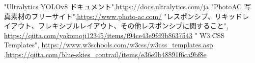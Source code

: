 

\renewcommand{\bibname}{参考文献}
\begin{thebibliography}{99}
"Ultralytics YOLOv8 ドキュメント",\url{https://docs.ultralytics.com/ja}
 "PhotoAC 写真素材のフリーサイト",\url{https://www.photo-ac.com/}
"レスポンシブ、リキッドレイアウト、フレキシブルレイアウト、その他レスポンシブに関すること", \url{https://qiita.com/yokomoji12345/items/f94ce43e9fd9b8637543}
" W3.CSS Templates", \url{https://www.w3schools.com/w3css/w3css_templates.asp}
,\url{https://qiita.com/blue-skies_contrail/items/e36e9b48891f6ca9bf8e}

 \end{thebibliography}
 
